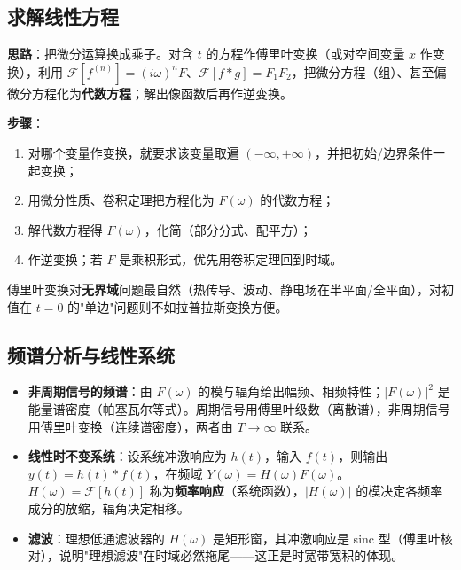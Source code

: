\subsection{求解线性方程}

\textbf{思路}：把微分运算换成乘子。对含 \(t\) 的方程作傅里叶变换（或对空间变量 \(x\) 作变换），利用 \(\mathscr{F}[f^{(n)}]=(i\omega)^nF\)、\(\mathscr{F}[f*g]=F_1F_2\)，把微分方程（组）、甚至偏微分方程化为\textbf{代数方程}；解出像函数后再作逆变换。

\textbf{步骤}：
\begin{enumerate}
    \item 对哪个变量作变换，就要求该变量取遍 \((-\infty,+\infty)\)，并把初始/边界条件一起变换；
    \item 用微分性质、卷积定理把方程化为 \(F(\omega)\) 的代数方程；
    \item 解代数方程得 \(F(\omega)\)，化简（部分分式、配平方）；
    \item 作逆变换；若 \(F\) 是乘积形式，优先用卷积定理回到时域。
\end{enumerate}

傅里叶变换对\textbf{无界域}问题最自然（热传导、波动、静电场在半平面/全平面），对初值在 \(t=0\) 的"单边"问题则不如拉普拉斯变换方便。

\subsection{频谱分析与线性系统}

\begin{itemize}
    \item \textbf{非周期信号的频谱}：由 \(F(\omega)\) 的模与辐角给出幅频、相频特性；\(|F(\omega)|^2\) 是能量谱密度（帕塞瓦尔等式）。周期信号用傅里叶级数（离散谱），非周期信号用傅里叶变换（连续谱密度），两者由 \(T\to\infty\) 联系。
    \item \textbf{线性时不变系统}：设系统冲激响应为 \(h(t)\)，输入 \(f(t)\)，则输出 \(y(t)=h(t)*f(t)\)，在频域 \(Y(\omega)=H(\omega)F(\omega)\)。\(H(\omega)=\mathscr{F}[h(t)]\) 称为\textbf{频率响应}（系统函数），\(|H(\omega)|\) 的模决定各频率成分的放缩，辐角决定相移。
    \item \textbf{滤波}：理想低通滤波器的 \(H(\omega)\) 是矩形窗，其冲激响应是 sinc 型（傅里叶核对），说明"理想滤波"在时域必然拖尾——这正是时宽带宽积的体现。
\end{itemize}

